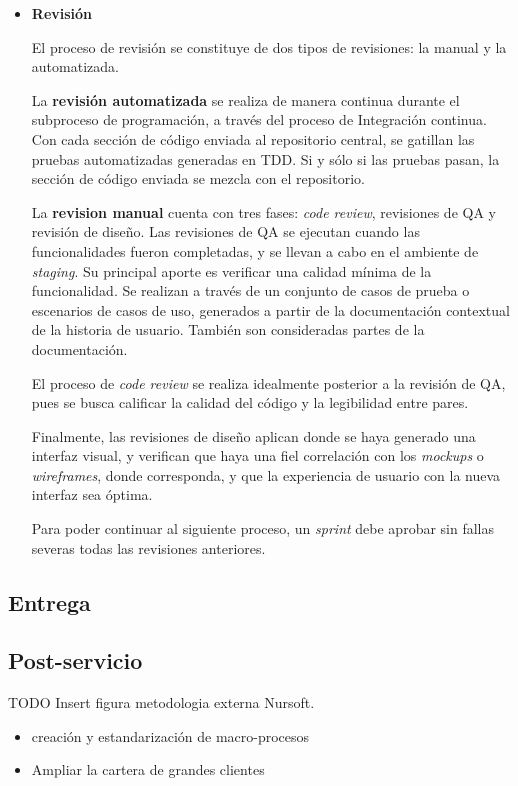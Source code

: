 \begin{itemize}
  \item \textbf{Revisión}
  
  El proceso de revisión se constituye de dos tipos de revisiones: la manual y la automatizada.

  La \textbf{revisión automatizada} se realiza de manera continua durante el subproceso de programación, a través del proceso de Integración continua.
  Con cada sección de código enviada al repositorio central, se gatillan las pruebas automatizadas generadas en TDD. Si y sólo si las
  pruebas pasan, la sección de código enviada se mezcla con el repositorio.

  La \textbf{revision manual} cuenta con tres fases: \textit{code review}, revisiones de QA y revisión de diseño. Las revisiones de QA
  se ejecutan cuando las funcionalidades fueron completadas, y se llevan a cabo en el ambiente de \textit{staging}. 
  Su principal aporte es verificar una calidad mínima de la funcionalidad. Se realizan a través de un conjunto de casos de prueba o
  escenarios de casos de uso, generados a partir de la documentación contextual de la historia de usuario. También son consideradas partes de la documentación.

  El proceso de \textit{code review} se realiza idealmente posterior a la revisión de QA, pues se busca calificar la calidad
  del código y la legibilidad entre pares.

  Finalmente, las revisiones de diseño aplican donde se haya generado una interfaz visual, y verifican que haya una fiel correlación
  con los \textit{mockups} o \textit{wireframes}, donde corresponda, y que la experiencia de usuario con la nueva interfaz sea óptima.

  Para poder continuar al siguiente proceso, un \textit{sprint} debe aprobar sin fallas severas todas las revisiones anteriores.

\end{itemize}

\subsection{Entrega}
\subsection{Post-servicio}


TODO Insert figura metodologia externa Nursoft.

\begin{itemize}
  \item creación y estandarización de macro-procesos
  \item Ampliar la cartera de grandes clientes 
\end{itemize}



